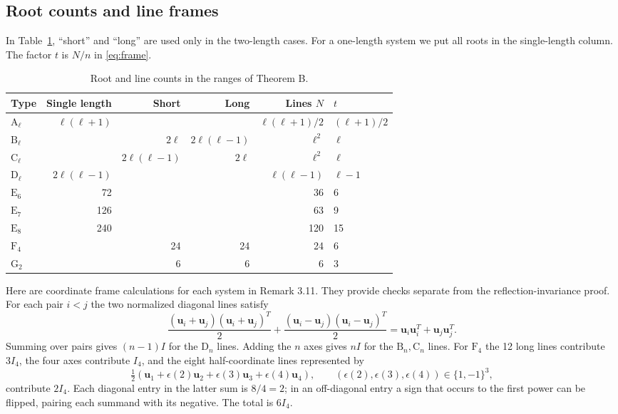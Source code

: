 \documentclass[11pt]{amsart}
\newcommand\Zu{{\mathbf u}}
\theoremstyle{definition}
\newcommand{\typ}[1]{\mathrm{#1}}
\begin{document}
\subsection{Root counts and line frames}

In Table~\ref{tab:roots}, ``short'' and ``long'' are used only in the
two-length cases. For a one-length system we put all roots in the
single-length column. The factor $t$ is $N/n$ in \eqref{eq:frame}.
\begin{table}[ht]
\centering
\small
\begin{tabular}{@{}lrrrrl@{}}
\toprule
Type&Single length&Short&Long&Lines $N$&$t$\\\midrule
$\typ A_\ell$&$\ell(\ell+1)$& & &$\ell(\ell+1)/2$&$(\ell+1)/2$\\
$\typ B_\ell$& &$2\ell$&$2\ell(\ell-1)$&$\ell^2$&$\ell$\\
$\typ C_\ell$& &$2\ell(\ell-1)$&$2\ell$&$\ell^2$&$\ell$\\
$\typ D_\ell$&$2\ell(\ell-1)$& & &$\ell(\ell-1)$&$\ell-1$\\
$\typ E_6$&72& & &36&6\\
$\typ E_7$&126& & &63&9\\
$\typ E_8$&240& & &120&15\\
$\typ F_4$& &24&24&24&6\\
$\typ G_2$& &6&6&6&3\\\bottomrule
\end{tabular}
\caption{Root and line counts in the ranges of Theorem B.}
\label{tab:roots}
\end{table}

Here are coordinate frame calculations for each system in Remark 3.11.
They provide checks separate from the reflection-invariance proof.
For each pair $i<j$ the two normalized diagonal lines satisfy
\[
 \frac{(\Zu_i+\Zu_j)(\Zu_i+\Zu_j)^T}{2}
 +\frac{(\Zu_i-\Zu_j)(\Zu_i-\Zu_j)^T}{2}
 =\Zu_i\Zu_i^T+\Zu_j\Zu_j^T.
\]
Summing over pairs gives $(n-1)I$ for the $\typ D_n$ lines.
Adding the $n$ axes gives $nI$ for the $\typ B_n,\typ C_n$ lines.
For $\typ F_4$ the 12 long lines contribute $3I_4$, the four axes
contribute $I_4$, and the eight half-coordinate lines represented by
\[
 \tfrac12(\Zu_1+\epsilon(2)\Zu_2+\epsilon(3)\Zu_3+\epsilon(4)\Zu_4),
 \qquad (\epsilon(2),\epsilon(3),\epsilon(4))\in\{1,-1\}^3,
\]
contribute $2I_4$. Each diagonal entry in the latter sum is $8/4=2$;
in an off-diagonal entry a sign that occurs to the first power can be
flipped, pairing each summand with its negative. The total is $6I_4$.
\end{document}
